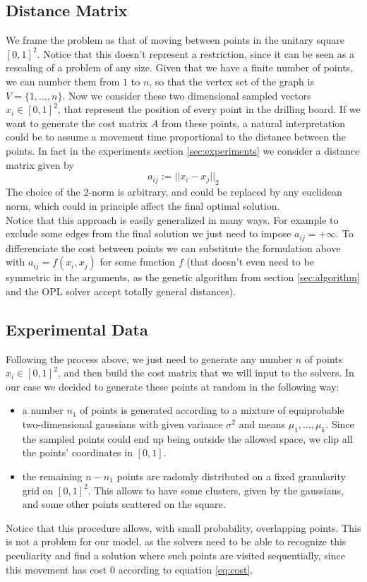 \documentclass{article}
\begin{document}
\subsection{Distance Matrix}
We frame the problem as that of moving between points in the unitary square $[0, 1]^2$. Notice that this doesn't represent a restriction, since it can be seen as a rescaling of a problem of any size. Given that we have a finite number of points, we can number them from $1$ to $n$, so that the vertex set of the graph is $V = \{ 1, \ldots, n  \}$. Now we consider these two dimensional sampled vectors $x_i \in [0, 1]^2 $, that represent the position of every point in the drilling board. If we want to generate the cost matrix $A$ from these points, a natural interpretation could be to assume a movement time proportional to the distance between the points. In fact in the experiments section \ref{sec:experiments} we consider a distance matrix given by
\begin{equation}\label{eq:cost}
a_{ij} := {|| x_i - x_j ||}_2
\end{equation} 
The choice of the 2-norm is arbitrary, and could be replaced by any euclidean norm, which could in principle affect the final optimal solution. \\
Notice that this approach is easily generalized in many ways. For example to exclude some edges from the final solution we just need to impose $a_{ij} = +\infty$. To differenciate the cost between points we can substitute the formulation above with $a_{ij} = f(x_i, x_j)$ for some function $f$ (that doesn't even need to be symmetric in the arguments, as the genetic algorithm from section \ref{sec:algorithm} and the OPL solver accept totally general distances).  

\subsection{Experimental Data}\label{sec:experimental_data}
Following the process above, we just need to generate any number $n$ of points $x_i \in [0, 1]^2 $, and then build the cost matrix that we will input to the solvers. In our case we decided to generate these points at random in the following way:
\begin{itemize}
\item a number $n_1$ of points is generated according to a mixture of equiprobable two-dimensional gaussians with given variance $\sigma^2$ and means $\mu_1, \ldots, \mu_k$. Since the sampled points could end up being outside the allowed space, we clip all the points' coordinates in $[0, 1]$. 
\item the remaining $n-n_1$ points are radomly distributed on a fixed granularity grid on  $[0, 1]^2$. This allows to have some clusters, given by the gaussians, and some other points scattered on the square. 
\end{itemize}
Notice that this procedure allows, with small probability, overlapping points. This is not a problem for our model, as the solvers need to be able to recognize this peculiarity and find a solution where such points are visited sequentially, since this movement has cost 0 according to equation \eqref{eq:cost}.
\end{document}
